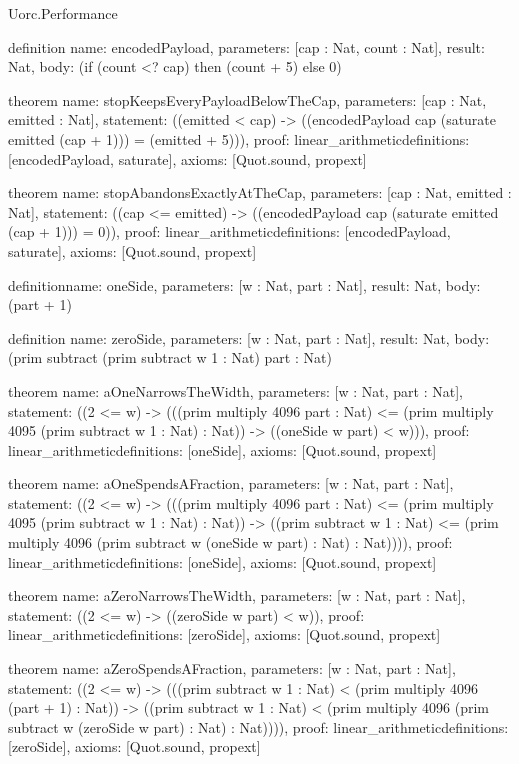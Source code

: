 \begin{lexlean}{Uorc.Performance}
\begin{semanticmodule}
definition{
  name: encodedPayload,
  parameters: [cap : Nat, count : Nat],
  result: Nat,
  body: (if (count <? cap) then (count + 5) else 0)
}

theorem{
  name: stopKeepsEveryPayloadBelowTheCap,
  parameters: [cap : Nat, emitted : Nat],
  statement: ((emitted < cap) -> ((encodedPayload cap (saturate emitted (cap + 1))) = (emitted + 5))),
  proof: linear_arithmetic{definitions: [encodedPayload, saturate]},
  axioms: [Quot.sound, propext]
}

theorem{
  name: stopAbandonsExactlyAtTheCap,
  parameters: [cap : Nat, emitted : Nat],
  statement: ((cap <= emitted) -> ((encodedPayload cap (saturate emitted (cap + 1))) = 0)),
  proof: linear_arithmetic{definitions: [encodedPayload, saturate]},
  axioms: [Quot.sound, propext]
}

definition{name: oneSide, parameters: [w : Nat, part : Nat], result: Nat, body: (part + 1)}

definition{
  name: zeroSide,
  parameters: [w : Nat, part : Nat],
  result: Nat,
  body: (prim subtract (prim subtract w 1 : Nat) part : Nat)
}

theorem{
  name: aOneNarrowsTheWidth,
  parameters: [w : Nat, part : Nat],
  statement: ((2 <= w) -> (((prim multiply 4096 part : Nat) <= (prim multiply 4095 (prim subtract w 1 : Nat) : Nat)) -> ((oneSide w part) < w))),
  proof: linear_arithmetic{definitions: [oneSide]},
  axioms: [Quot.sound, propext]
}

theorem{
  name: aOneSpendsAFraction,
  parameters: [w : Nat, part : Nat],
  statement: ((2 <= w) -> (((prim multiply 4096 part : Nat) <= (prim multiply 4095 (prim subtract w 1 : Nat) : Nat)) -> ((prim subtract w 1 : Nat) <= (prim multiply 4096 (prim subtract w (oneSide w part) : Nat) : Nat)))),
  proof: linear_arithmetic{definitions: [oneSide]},
  axioms: [Quot.sound, propext]
}

theorem{
  name: aZeroNarrowsTheWidth,
  parameters: [w : Nat, part : Nat],
  statement: ((2 <= w) -> ((zeroSide w part) < w)),
  proof: linear_arithmetic{definitions: [zeroSide]},
  axioms: [Quot.sound, propext]
}

theorem{
  name: aZeroSpendsAFraction,
  parameters: [w : Nat, part : Nat],
  statement: ((2 <= w) -> (((prim subtract w 1 : Nat) < (prim multiply 4096 (part + 1) : Nat)) -> ((prim subtract w 1 : Nat) < (prim multiply 4096 (prim subtract w (zeroSide w part) : Nat) : Nat)))),
  proof: linear_arithmetic{definitions: [zeroSide]},
  axioms: [Quot.sound, propext]
}


\end{semanticmodule}
\end{lexlean}
